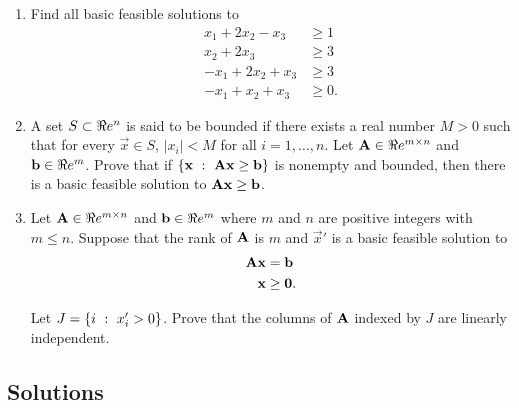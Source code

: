 \begin{enumerate}
\def\labelenumi{\arabic{enumi}.}
\item
  Find all basic feasible solutions to
  \begin{align*}
    x_1 + 2x_2 - x_3 & \geq 1\\ 
    x_2 + 2x_3 & \geq 3 \\ 
    -x_1 + 2x_2 + x_3 & \geq 3 \\ 
   - x_1 + x_2 + x_3 & \geq 0.\end{align*}
\item
  A set \(S \subset \Re e^n\) is said to be bounded if there exists a real
  number \(M \gt 0\) such that for every \(\vec{x} \in S\),
  \(|x_i| \lt M\) for all \(i = 1,\ldots, n\). Let
  \(\mathbf{A} \in\Re e^{m\times n}\) and \(\mathbf{b}\in \Re e^m\). Prove that if
  \(\{ \mathbf{x} ~:~ \mathbf{A} \mathbf{x} \geq \mathbf{b}\}\) is nonempty and
  bounded, then there is a basic feasible solution to
  \(\mathbf{A} \mathbf{x} \geq \mathbf{b}\).
\item
  Let \(\mathbf{A} \in \Re e^{m \times n}\) and \(\mathbf{b} \in \Re e^m\) where
  \(m\) and \(n\) are positive integers with \(m \leq n\). Suppose that
  the rank of \(\mathbf{A}\) is \(m\) and \(\vec{x}'\) is a basic feasible
  solution to
  \begin{align*}
    \mathbf{A}\mathbf{x} & = \mathbf{b} \\
    \mathbf{x} & \geq \mathbf{0}.
     \end{align*}

  Let \(J = \{ i ~:~ x'_i > 0\}\). Prove that the columns of
  \(\mathbf{A}\) indexed by \(J\) are linearly independent.
\end{enumerate}

\subsection*{Solutions}\label{solutions-8}

